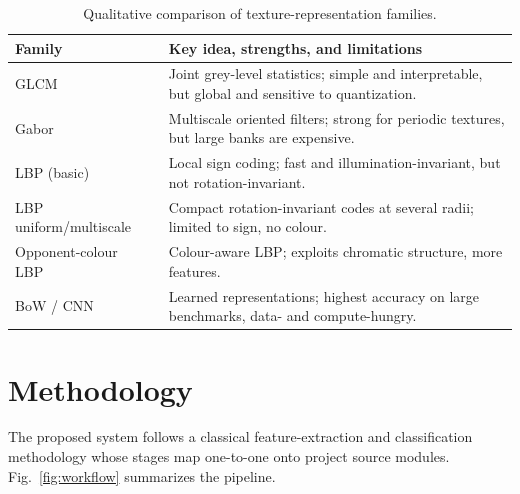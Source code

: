 \documentclass[conference]{IEEEtran}
\begin{document}
\begin{table}[!t]
\renewcommand{\arraystretch}{1.15}
\caption{Qualitative comparison of texture-representation families.}
\label{tab:related}
\centering
\footnotesize
\begin{tabular}{@{}p{2.6cm}p{5.6cm}@{}}
\hline
\bfseries Family & \bfseries Key idea, strengths, and limitations\\
\hline
GLCM~\cite{haralick1973} & Joint grey-level statistics; simple and
interpretable, but global and sensitive to quantization.\\
Gabor~\cite{daugman1985,manjunath1996} & Multiscale oriented filters;
strong for periodic textures, but large banks are expensive.\\
LBP (basic)~\cite{ojala1996comparative} & Local sign coding; fast and
illumination-invariant, but not rotation-invariant.\\
LBP uniform/multiscale~\cite{ojala2002multiresolution} & Compact
rotation-invariant codes at several radii; limited to sign, no colour.\\
Opponent-colour LBP~\cite{maenpaa2004} & Colour-aware LBP; exploits
chromatic structure, more features.\\
BoW / CNN~\cite{liu2019bowcnn} & Learned representations; highest
accuracy on large benchmarks, data- and compute-hungry.\\
\hline
\end{tabular}
\end{table}

\section{Methodology}\label{sec:meth}
The proposed system follows a classical feature-extraction and
classification methodology whose stages map one-to-one onto project source
modules. Fig.~\ref{fig:workflow} summarizes the pipeline.
\end{document}
